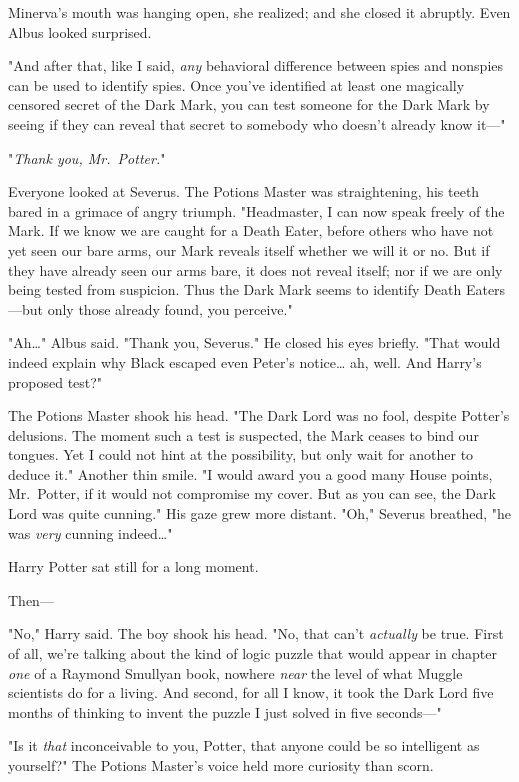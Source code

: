Minerva's mouth was hanging open, she realized; and she closed it abruptly. 
Even Albus looked surprised.

"And after that, like I said, \emph{any} behavioral difference between spies 
and nonspies can be used to identify spies. Once you've identified at least one 
magically censored secret of the Dark Mark, you can test someone for the Dark 
Mark by seeing if they can reveal that secret to somebody who doesn't already 
know it---"

"\emph{Thank you, Mr.~Potter.}"

Everyone looked at Severus. The Potions Master was straightening, his teeth 
bared in a grimace of angry triumph. "Headmaster, I can now speak freely of the 
Mark. If we know we are caught for a Death Eater, before others who have not 
yet seen our bare arms, our Mark reveals itself whether we will it or no. But 
if they have already seen our arms bare, it does not reveal itself; nor if we 
are only being tested from suspicion. Thus the Dark Mark seems to identify 
Death Eaters---but only those already found, you perceive."

"Ah{\ldots}" Albus said. "Thank you, Severus." He closed his eyes briefly. 
"That would indeed explain why Black escaped even Peter's notice{\ldots} ah, 
well. And Harry's proposed test?"

The Potions Master shook his head. "The Dark Lord was no fool, despite Potter's 
delusions. The moment such a test is suspected, the Mark ceases to bind our 
tongues. Yet I could not hint at the possibility, but only wait for another to 
deduce it." Another thin smile. "I would award you a good many House points, 
Mr.~Potter, if it would not compromise my cover. But as you can see, the Dark 
Lord was quite cunning." His gaze grew more distant. "Oh," Severus breathed, 
"he was \emph{very} cunning indeed{\ldots}"

Harry Potter sat still for a long moment.

Then---

"No," Harry said. The boy shook his head. "No, that can't \emph{actually} be 
true. First of all, we're talking about the kind of logic puzzle that would 
appear in chapter \emph{one} of a Raymond Smullyan book, nowhere \emph{near} 
the level of what Muggle scientists do for a living. And second, for all I 
know, it took the Dark Lord five months of thinking to invent the puzzle I just 
solved in five seconds---"

"Is it \emph{that} inconceivable to you, Potter, that anyone could be so 
intelligent as yourself?" The Potions Master's voice held more curiosity than 
scorn.

